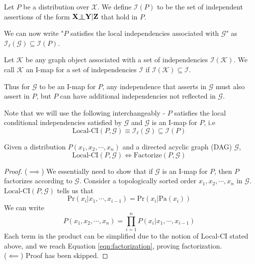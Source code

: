 \begin{defn}
Let $P$ be a distribution over $\mathcal X$. We define $\mathcal{I}(P)$ to be the set of independent assertions of the form $\mathbf X \ind \mathbf Y | \mathbf Z$ that hold in $P$.
\end{defn}
We can now write "$P$ satisfies the local independencies associated with $\mathcal  G$" as $\mathcal{I}_\ell(\mathcal G) \subseteq \mathcal{I}(P)$.
\begin{defn}
Let $\mathcal K$ be any graph object associated with a set of independencies $\mathcal{I}(\mathcal K)$. We call $\mathcal K$ an I-map for a set of independencies $\mathcal I$ if $\mathcal I(\mathcal K) \subseteq \mathcal I$.
\end{defn}
Thus for $\mathcal G$ to be an I-map for $P$, any independence that asserts in $\mathcal G$ must also assert in $P$, but $P$ can have additional independencies not reflected in $\mathcal G$.
\begin{rem}
Note that we will use the following interchangeably - $P$ satisfies the local conditional independencies satisfied by $\mathcal G$ and $\mathcal G$ is an I-map for $P$, i.e
\begin{equation}
	\text{Local-CI}(P, \mathcal G) \equiv \mathcal{I_\ell(G)} \subseteq \mathcal{I}(P)
\end{equation}
\end{rem}
\begin{thm}
Given a distribution $P(x_1, x_2, \cdots, x_n)$ and a directed acyclic graph (DAG) $\mathcal{G}$, 
\begin{equation}
\text{Local-CI}(P, \mathcal G) \Longleftrightarrow \text{Factorize}(P, \mathcal G)
\end{equation}
\end{thm}
\begin{proof}
($\implies$) We essentially need to show that if $\mathcal{G}$ is an I-map for $P$, then $P$ factorizes according to $\mathcal G$. Consider a topologically sorted order $x_1, x_2, \cdots, x_n$ in $\mathcal G$. $\text{Local-CI}(P, \mathcal G)$ tells us that $$\text{Pr}(x_i|x_{1}, \cdots, x_{i-1}) = \text{Pr}(x_i|\text{Pa}(x_i))$$
We can write
$$P(x_1, x_2, \cdots, x_n) = \prod_{i=1}^nP(x_i|x_1, \cdots, x_{i-1})$$
Each term in the product can be simplified due to the notion of Local-CI stated above, and we reach Equation \ref{eqn:factorization}, proving factorization. \\
($\impliedby$) Proof has been skipped.
\end{proof}
